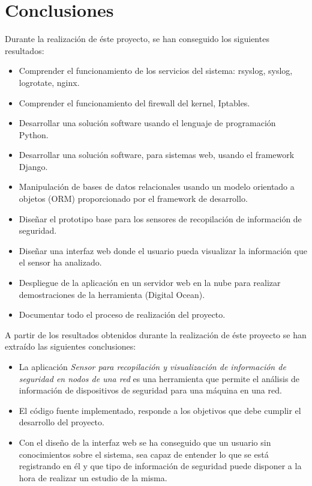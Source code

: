 \chapter{Conclusiones}
\label{chap:conclusiones}

Durante la realización de éste proyecto, se han conseguido los siguientes resultados:

\begin{itemize}
\item Comprender el funcionamiento de los servicios del sistema: rsyslog, syslog, logrotate, nginx.
\item Comprender el funcionamiento del firewall del kernel, Iptables.
\item Desarrollar una solución software usando el lenguaje de programación Python.
\item Desarrollar una solución software, para sistemas web, usando el framework Django.
\item Manipulación de bases de datos relacionales usando un modelo orientado a objetos (ORM) proporcionado por el framework de desarrollo.
\item Diseñar el prototipo base para los sensores de recopilación de información de seguridad.
\item Diseñar una interfaz web donde el usuario pueda visualizar la información que el sensor ha analizado.
\item Despliegue de la aplicación en un servidor web en la nube para realizar demostraciones de la herramienta (Digital Ocean).
\item Documentar todo el proceso de realización del proyecto.
\end{itemize}
\pagebreak
A partir de los resultados obtenidos durante la realización de éste proyecto se han extraído las siguientes conclusiones:

\begin{itemize}
\item La aplicación \textit{Sensor para recopilación y visualización de información de seguridad en nodos de una red} es una herramienta que permite el análisis de información de dispositivos de seguridad para una máquina en una red.
\item El código fuente implementado, responde a los objetivos que debe cumplir el desarrollo del proyecto.
\item Con el diseño de la interfaz web se ha conseguido que un usuario sin conocimientos sobre el sistema, sea capaz de entender lo que se está registrando en él y que tipo de información de seguridad puede disponer a la hora de realizar un estudio de la misma.
\end{itemize}
